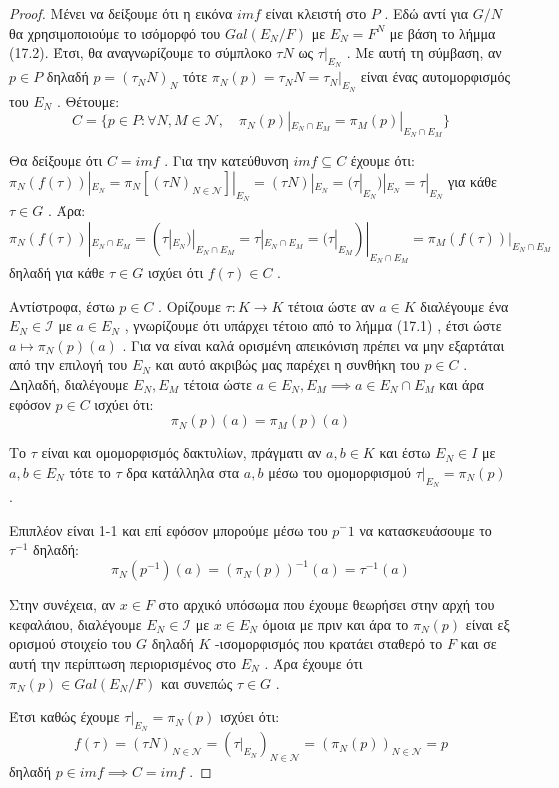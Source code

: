 \documentclass[oneside,a4paper]{article}
\begin{document}
\begin{proof}
Μένει να δείξουμε ότι η εικόνα $imf$ είναι κλειστή στο $P$ . Εδώ αντί για $G/N$ θα χρησιμοποιούμε το ισόμορφό του $Gal(E_N / F)$ με $E_N = F^N$ με βάση το λήμμα (17.2). Έτσι, θα αναγνωρίζουμε το σύμπλοκο $\tau N$ ως $\tau|_{E_N}$ . Με αυτή τη σύμβαση, αν $p \in P$ δηλαδή $p = (\tau_N N)_{N}$ τότε $\pi_N (p) = \tau_N N = \tau_N |_{E_N}$ είναι ένας αυτομορφισμός του $E_N$ . Θέτουμε:
$$C = \{ p \in P: \forall N,M \in \mathcal{N} ,\quad \pi_N (p) |_{E_N \cap E_M} = \pi_M(p)|_{E_N \cap E_M}\}$$

Θα δείξουμε ότι $C=imf$ . Για την κατεύθυνση $imf \subseteq C$ έχουμε ότι:
$\pi_N (f(\tau))|_{E_N} =\pi_N [(\tau N)_{N \in \mathcal{N}}]|_{E_N} = (\tau N) |_{E_N} = (\tau|_{E_N})|_{E_N} = \tau|_{E_N}$ για κάθε $\tau \in G$ . Άρα:
$$\pi_N (f(\tau))|_{E_N \cap E_M}=(\tau|_{E_N})|_{E_N \cap E_M} = \tau|_{E_N \cap E_M} = (\tau|_{E_M})|_{E_N \cap E_M} =\pi_M (f(\tau))|_{E_N \cap E_M}$$
δηλαδή για κάθε $\tau \in G$ ισχύει ότι $f(\tau) \in C$ .

Αντίστροφα, έστω $p \in C$ . Ορίζουμε $\tau : K \rightarrow K$ τέτοια ώστε αν $a \in K$ διαλέγουμε ένα $E_N \in \mathcal{I}$ με $a \in E_N$ , γνωρίζουμε ότι υπάρχει τέτοιο από το λήμμα (17.1) , έτσι ώστε $a \mapsto \pi_N (p) (a)$ . Για να είναι καλά ορισμένη απεικόνιση πρέπει να μην εξαρτάται από την επιλογή του $E_N$ και αυτό ακριβώς μας παρέχει η συνθήκη του $p \in C$ . Δηλαδή, διαλέγουμε $E_N, E_M$ τέτοια ώστε $a \in E_N, E_M \implies a \in E_N \cap E_M$ και άρα εφόσον $p \in C$ ισχύει ότι:
$$\pi_N (p) (a) =  \pi_M (p) (a)$$
 

Το $\tau$ είναι και ομομορφισμός δακτυλίων, πράγματι αν $a,b \in K$ και έστω $E_N \in I$ με $a,b \in E_N$ τότε το $\tau$ δρα κατάλληλα στα $a,b$ μέσω του ομομορφισμού $\tau|_{E_N} = \pi_N (p)$ .

Επιπλέον είναι 1-1 και επί εφόσον μπορούμε μέσω του $p^-1$ να κατασκευάσουμε το $\tau^{-1}$ δηλαδή:
$$\pi_N (p^{-1}) (a) = (\pi_N (p))^{-1} (a) = \tau^{-1} (a)$$

Στην συνέχεια, αν $x \in F$ στο αρχικό υπόσωμα που έχουμε θεωρήσει στην αρχή του κεφαλάιου, διαλέγουμε $E_N \in \mathcal{I}$ με $x \in E_N$ όμοια με πριν και άρα το $\pi_N (p)$ είναι εξ ορισμού στοιχείο του $G$ δηλαδή $K$ -ισομορφισμός που κρατάει σταθερό το $F$ και σε αυτή την περίπτωση περιορισμένος στο $E_N$ . Άρα έχουμε ότι $\pi_N (p) \in Gal(E_N/F)$ και συνεπώς $\tau \in G$ .

Έτσι καθώς έχουμε $\tau |_{E_N}=\pi_N (p)$ ισχύει ότι:
$$f(\tau) = (\tau N)_{N \in \mathcal{N}} = (\tau|_{E_N})_{N \in \mathcal{N}} = (\pi_N (p))_{N \in \mathcal{N}} = p$$
δηλαδή $p \in imf \implies C=imf$ .


\end{proof}
\end{document}
